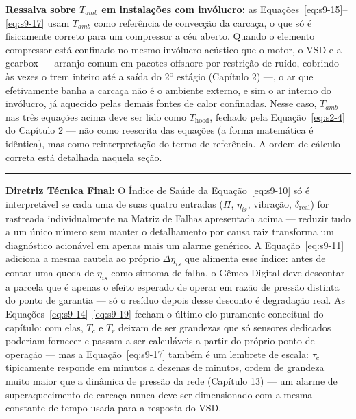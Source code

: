 \documentclass[12pt,a4paper]{article}
\numberwithin{equation}{section}
\numberwithin{table}{section}
\numberwithin{figure}{section}
\begin{document}
	\textbf{Ressalva sobre $T_{amb}$ em instalações com invólucro:} as Equações~\eqref{eq:s9-15}--\eqref{eq:s9-17} usam $T_{amb}$ como referência de convecção da carcaça, o que só é fisicamente correto para um compressor a céu aberto. Quando o elemento compressor está confinado no mesmo invólucro acústico que o motor, o VSD e a gearbox — arranjo comum em pacotes offshore por restrição de ruído, cobrindo às vezes o trem inteiro até a saída do 2º estágio (Capítulo 2) —, o ar que efetivamente banha a carcaça não é o ambiente externo, e sim o ar interno do invólucro, já aquecido pelas demais fontes de calor confinadas. Nesse caso, $T_{amb}$ nas três equações acima deve ser lido como $T_{\text{hood}}$, fechado pela Equação~\eqref{eq:s2-4} do Capítulo 2 — não como reescrita das equações (a forma matemática é idêntica), mas como reinterpretação do termo de referência. A ordem de cálculo correta está detalhada naquela seção.

	\vspace{1em}
	\hrule
	\vspace{1em}

	\textbf{Diretriz Técnica Final:} O Índice de Saúde da Equação~\eqref{eq:s9-10} só é interpretável se cada uma de suas quatro entradas ($\Pi$, $\eta_{is}$, vibração, $\delta_{\text{real}}$) for rastreada individualmente na Matriz de Falhas apresentada acima — reduzir tudo a um único número sem manter o detalhamento por causa raiz transforma um diagnóstico acionável em apenas mais um alarme genérico. A Equação~\eqref{eq:s9-11} adiciona a mesma cautela ao próprio $\Delta\eta_{is}$ que alimenta esse índice: antes de contar uma queda de $\eta_{is}$ como sintoma de falha, o Gêmeo Digital deve descontar a parcela que é apenas o efeito esperado de operar em razão de pressão distinta do ponto de garantia — só o resíduo depois desse desconto é degradação real. As Equações~\eqref{eq:s9-14}--\eqref{eq:s9-19} fecham o último elo puramente conceitual do capítulo: com elas, $T_c$ e $T_r$ deixam de ser grandezas que só sensores dedicados poderiam fornecer e passam a ser calculáveis a partir do próprio ponto de operação — mas a Equação~\eqref{eq:s9-17} também é um lembrete de escala: $\tau_c$ tipicamente responde em minutos a dezenas de minutos, ordem de grandeza muito maior que a dinâmica de pressão da rede (Capítulo 13) — um alarme de superaquecimento de carcaça nunca deve ser dimensionado com a mesma constante de tempo usada para a resposta do VSD.

	
	
\end{document}
